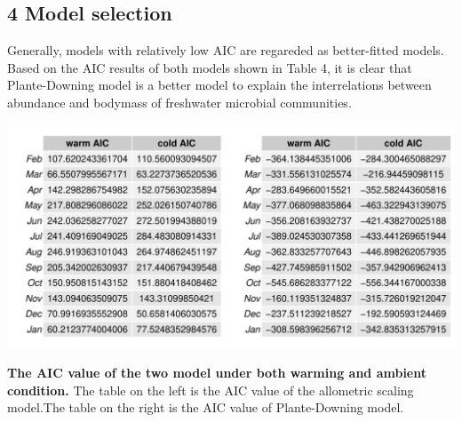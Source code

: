 \documentclass[11pt]{article}
\begin{document}
\begin{linenumbers}
\section*{4 Model selection}
Generally, models with relatively low AIC are regareded as better-fitted models. Based on the AIC results of both models shown in Table 4, it is clear that Plante-Downing model is a better model to explain the interrelations between abundance and bodymass of freshwater microbial communities.


\begin{table}[H]
  \centering
  \includegraphics[scale = 0.8]{../Graph/aic.pdf}
  \caption{\textbf{The AIC value of the two model under both warming and ambient condition.}
  The table on the left is the AIC value of the allometric scaling model.The table on the right is the AIC value of Plante-Downing model. }
\end{table}


\end{linenumbers}
\end{document}
